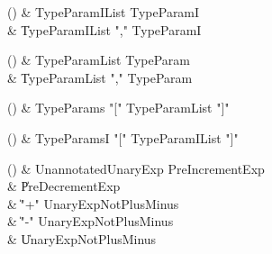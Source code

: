 \begin{bbgrammarappendix}

() & TypeParamIList \label{prod:TypeParamIList}  \: TypeParamI  \\

 &    \| TypeParamIList \xcd"," TypeParamI \\

\end{bbgrammarappendix}

\begin{bbgrammarappendix}

() & TypeParamList \label{prod:TypeParamList}  \: TypeParam  \\

 &    \| TypeParamList \xcd"," TypeParam \\

\end{bbgrammarappendix}

\begin{bbgrammarappendix}

() & TypeParams \label{prod:TypeParams}  \: \xcd"[" TypeParamList \xcd"]"  \\


\end{bbgrammarappendix}

\begin{bbgrammarappendix}

() & TypeParamsI \label{prod:TypeParamsI}  \: \xcd"[" TypeParamIList \xcd"]"  \\


\end{bbgrammarappendix}

\begin{bbgrammarappendix}

() & UnannotatedUnaryExp \label{prod:UnannotatedUnaryExp}  \: PreIncrementExp  \\

 &    \| PreDecrementExp \\
 &    \| \xcd"+" UnaryExpNotPlusMinus \\
 &    \| \xcd"-" UnaryExpNotPlusMinus \\
 &    \| UnaryExpNotPlusMinus \\

\end{bbgrammarappendix}

